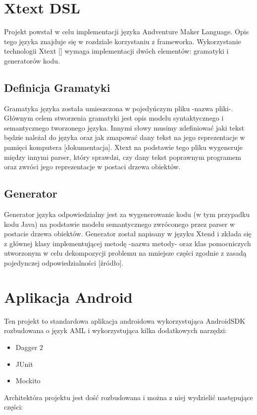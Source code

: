 \documentclass	{xmgr}
\begin{document}
\section{Xtext DSL} 
Projekt powstał w celu implementacji języka Andventure Maker Language. Opis tego języka znajduje się w rozdziale korzystaniu z frameworka.
Wykorzystanie technologii Xtext [] wymaga implementacji dwóch elementów: gramatyki i generatorów kodu. 

\subsection{Definicja Gramatyki} 
Gramatyka języka została umieszczona w pojedyńczym pliku -nazwa pliki-. Głównym celem stworzenia gramatyki jest opis modelu syntaktycznego i semantycznego tworzonego języka. Innymi słowy musimy zdefiniować jaki tekst będzie należał do języka oraz jak zmapować dany tekst na jego reprezentacje w pamięci komputera [dokumentacja]. Xtext na podstawie tego pliku wygeneruje między innymi parser, który sprawdzi, czy dany tekst poprawnym programem oraz zwróci jego reprezentacje w postaci drzewa obiektów.

\subsection{Generator}
Generator języka odpowiedzialny jest za wygenerowanie kodu (w tym przypadku kodu Java) na podstawie modelu semantycznego zwróconego przez parser w postacie drzewa obiektów. Generator został napisany w języku Xtend i zkłada się z głównej klasy implementującej metodę -nazwa metody- oraz klas pomocniczych utworzonym w celu dekompozycji problemu na mniejsze części zgodnie z zasadą pojedynczej odpowiedzialności [źródło].

\section{Aplikacja Android}
Ten projekt to standardowa aplikacja androidowa wykorzystująca AndroidSDK rozbudowana o język AML i wykorzystująca kilka dodatkowych narzędzi:
\begin{itemize}
	\item Dagger 2
	\item JUnit
	\item Mockito
\end{itemize}

Architektóra projektu jest dość rozbudowana i można z niej wydzielić następujące części:
\end{document}
